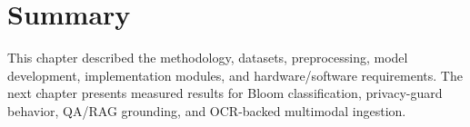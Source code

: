 \section{Summary}

This chapter described the methodology, datasets, preprocessing, model development, implementation modules, and hardware/software requirements. The next chapter presents measured results for Bloom classification, privacy-guard behavior, QA/RAG grounding, and OCR-backed multimodal ingestion.
